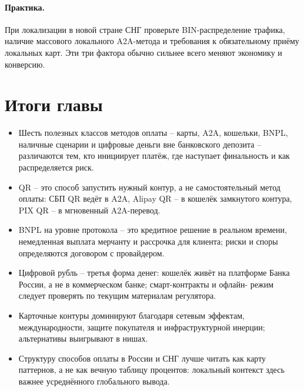 \paragraph{Практика.}
При локализации в новой стране СНГ проверьте BIN-распределение трафика, наличие массового локального A2A-метода и требования к обязательному приёму локальных карт. Эти три фактора обычно сильнее всего меняют экономику и конверсию.


\section*{Итоги главы}
\begin{itemize}
  \item Шесть полезных классов методов оплаты -- карты, A2A, кошельки,
        BNPL, наличные сценарии и цифровые деньги вне банковского
        депозита -- различаются тем, кто инициирует платёж, где
        наступает финальность и как распределяется риск.
  \item QR -- это способ запустить нужный контур, а не самостоятельный
        метод оплаты: СБП QR ведёт в A2A, Alipay QR -- в кошелёк
        замкнутого контура, PIX QR -- в мгновенный A2A-перевод.
  \item BNPL на уровне протокола -- это кредитное решение в реальном
        времени, немедленная выплата мерчанту и рассрочка для клиента;
        риски и споры определяются договором с провайдером.
  \item Цифровой рубль -- третья форма денег: кошелёк живёт на платформе
        Банка России, а не в коммерческом банке; смарт-контракты и офлайн-
        режим следует проверять по текущим материалам регулятора.
  \item Карточные контуры доминируют благодаря сетевым эффектам,
        международности, защите покупателя и инфраструктурной инерции;
        альтернативы выигрывают в нишах.
  \item Структуру способов оплаты в России и СНГ лучше читать как карту
        паттернов, а не как вечную таблицу процентов: локальный контекст
        здесь важнее усреднённого глобального вывода.
\end{itemize}
